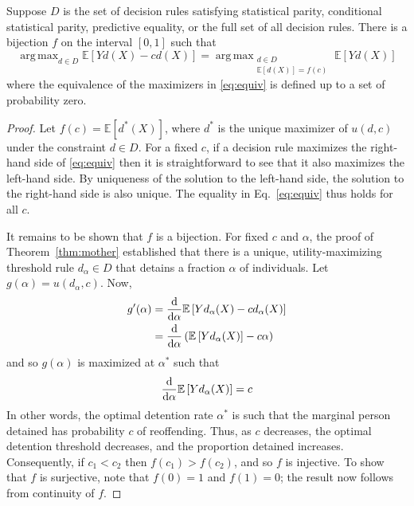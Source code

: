 \documentclass[sigconf]{acmart}
\DeclareMathOperator*{\argmax}{arg\,max}
\newcommand{\EE}{\mathbb{E}}
\begin{document}
\begin{proposition}
\label{prop:utility-equiv}
Suppose $D$ is the set of decision rules satisfying 
statistical parity, conditional statistical parity, predictive equality,
or the full set of all decision rules. 
There is a bijection $f$ on the interval $[0,1]$ such that
\begin{equation}
\label{eq:equiv}
\argmax_{d \in D} \EE \left [ Y d(X) - cd(X) \right ] 
= 
\argmax_{\substack{d \in D\\ \EE [d(X)] = f(c)}} 
\EE \left [ Y d(X) \right ] 
\end{equation}
where the equivalence of the maximizers in \eqref{eq:equiv} is defined up to a set of probability zero.
\end{proposition}

\begin{proof}
Let $f(c) = \EE \left[d^*(X)\right]$, where $d^*$ is the unique maximizer of $u(d, c)$ under the constraint $d \in D$.
For a fixed $c$, if a decision rule maximizes the right-hand side of \eqref{eq:equiv} then it is straightforward to see that it also maximizes the left-hand side. By uniqueness of the solution to the left-hand side, the solution to the right-hand side is also unique.
The equality in Eq.~\eqref{eq:equiv} thus holds for all $c$.

It remains to be shown that $f$ is a bijection. 
For fixed $c$ and $\alpha$, 
the proof of Theorem~\ref{thm:mother}
established that there is a unique, utility-maximizing 
threshold rule $d_{\alpha} \in D$ that detains a fraction $\alpha$ of individuals.
Let $g(\alpha) = u(d_{\alpha}, c)$.
Now,
\begin{align*}
g'(\alpha) &= \dv{\alpha} \EE \left[Yd_{\alpha}(X)-cd_{\alpha}(X)\right]\\
&= \dv{\alpha} \left(\EE \left[Yd_{\alpha}(X)\right]-c\alpha\right)
\end{align*}
and so $g(\alpha)$ is maximized at $\alpha^*$ such that
\begin{equation*}
\dv{\alpha} \EE \left[Yd_{\alpha}(X)\right]=c
\end{equation*}
In other words, the optimal detention rate $\alpha^*$ is such that the marginal person detained has probability $c$ of reoffending. Thus, as $c$ decreases, the optimal detention threshold decreases, and the proportion detained increases. Consequently, if $c_1 < c_2$ then $f(c_1) > f(c_2)$, 
and so $f$ is injective.
To show that $f$ is surjective, note that $f(0) = 1$ and $f(1) = 0$; the result now follows from continuity of $f$.
\end{proof}
\end{document}
